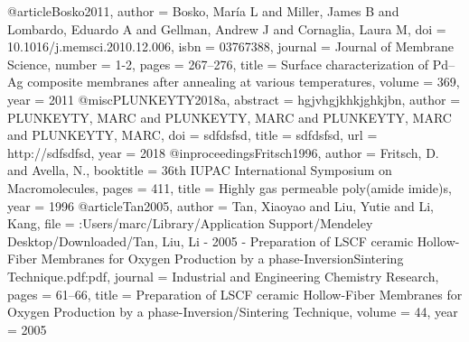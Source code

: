 @article{Bosko2011,
author = {Bosko, Mar{\'{i}}a L and Miller, James B and Lombardo, Eduardo A and Gellman, Andrew J and Cornaglia, Laura M},
doi = {10.1016/j.memsci.2010.12.006},
isbn = {03767388},
journal = {Journal of Membrane Science},
number = {1-2},
pages = {267--276},
title = {{Surface characterization of Pd–Ag composite membranes after annealing at various temperatures}},
volume = {369},
year = {2011}
}
@misc{PLUNKEYTY2018a,
abstract = {hgjvhgjkhkjghkjbn},
author = {PLUNKEYTY, MARC and PLUNKEYTY, MARC and PLUNKEYTY, MARC and PLUNKEYTY, MARC},
doi = {sdfdsfsd},
title = {sdfdsfsd},
url = {http://sdfsdfsd},
year = {2018}
}
@inproceedings{Fritsch1996,
author = {Fritsch, D. and Avella, N.},
booktitle = {36th IUPAC International Symposium on Macromolecules},
pages = {411},
title = {{Highly gas permeable poly(amide imide)s}},
year = {1996}
}
@article{Tan2005,
author = {Tan, Xiaoyao and Liu, Yutie and Li, Kang},
file = {:Users/marc/Library/Application Support/Mendeley Desktop/Downloaded/Tan, Liu, Li - 2005 - Preparation of LSCF ceramic Hollow-Fiber Membranes for Oxygen Production by a phase-InversionSintering Technique.pdf:pdf},
journal = {Industrial and Engineering Chemistry Research},
pages = {61--66},
title = {{Preparation of LSCF ceramic Hollow-Fiber Membranes for Oxygen Production by a phase-Inversion/Sintering Technique}},
volume = {44},
year = {2005}
}
